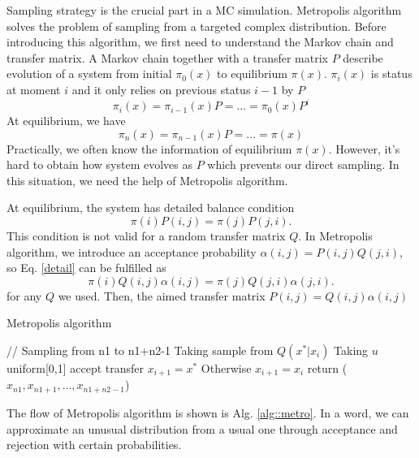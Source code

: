 Sampling strategy is the crucial part in a MC simulation.
Metropolis algorithm solves the problem of sampling from a targeted complex distribution.
Before introducing this algorithm, we first need to understand the Markov chain and transfer matrix.
A Markov chain together with a transfer matrix $P$ describe evolution of a system from initial $\pi_0(x)$ to equilibrium $\pi(x)$.
$\pi_i(x)$ is status at moment $i$ and it only relies on previous status $i-1$ by $P$
\begin{equation}
	\pi_i(x)=\pi_{i-1}(x)P = ... = \pi_0(x)P^i
\end{equation}
At equilibrium, we have 
\begin{equation}
	\pi_n(x)=\pi_{n-1}(x)P = ... = \pi(x)
\end{equation}
Practically, we often know the information of equilibrium $\pi(x)$. 
However, it's hard to obtain how system evolves as $P$ which prevents our direct sampling.
In this situation, we need the help of Metropolis algorithm. 

At equilibrium, the system has detailed balance condition
\begin{equation}\label{detail}
	\pi(i)P(i,j)=\pi(j)P(j,i).
\end{equation} 
This condition is not valid for a random transfer matrix $Q$.
In Metropolis algorithm, we introduce an acceptance probability $\alpha(i,j)=P(i,j)Q(j,i)$, so Eq. \ref{detail} can be fulfilled as
\begin{equation}\label{detail}
	\pi(i)Q(i,j)\alpha(i,j)=\pi(j)Q(j,i)\alpha(j,i).
\end{equation} 
for any $Q$ we used.
Then, the aimed transfer matrix $P(i,j)=Q(i,j)\alpha(i,j)$

\begin{algorithm}[tb]
	\caption{Metropolis algorithm}
	\label{alg::metro}
    // Sampling from n1 to n1+n2-1\;
    {Taking sample from $Q(x^{\ast}|x_i)$\;
    Taking $u$ ~ uniform[0,1]\;
    {
    accept transfer $x_{i+1}=x^{\ast}$
    }
    Otherwise $x_{i+1}=x_{i}$
    }
	return ($x_{n1},x_{n1+1},...,x_{n1+n2-1}$)\;
\end{algorithm}

The flow of Metropolis algorithm is shown is Alg. \ref{alg::metro}. 
In a word, we can approximate an unusual distribution from a usual one through acceptance and rejection with certain probabilities.